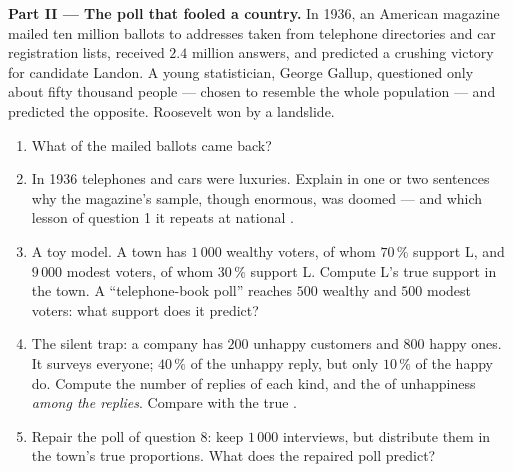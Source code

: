 \begin{problem}
\medskip
\noindent\textbf{Part II --- The poll that fooled a country.}
In 1936, an American magazine mailed ten million ballots to
addresses taken from telephone directories and car registration
lists, received $2.4$ million answers, and predicted a crushing
victory for candidate Landon. A young statistician, George
Gallup, questioned only about fifty thousand people --- chosen to
resemble the whole population --- and predicted the opposite.
Roosevelt won by a landslide.
\begin{enumerate}[resume]
  \item What  of the mailed ballots came back?
  \item In 1936 telephones and cars were luxuries. Explain in
        one or two sentences why the magazine's sample, though
        enormous, was doomed --- and which lesson of question 1
        it repeats at national .
  \item A toy model. A town has $1\,000$ wealthy voters, of whom
        $70\,\%$ support L, and $9\,000$ modest voters, of whom
        $30\,\%$ support L. Compute L's true support in the
        town. A ``telephone-book poll'' reaches $500$ wealthy
        and $500$ modest voters: what support does it predict?
  \item The silent trap: a company has $200$ unhappy customers
        and $800$ happy ones. It surveys everyone; $40\,\%$ of
        the unhappy reply, but only $10\,\%$ of the happy do.
        Compute the number of replies of each kind, and the
         of unhappiness \emph{among the replies}.
        Compare with the true .
  \item Repair the poll of question 8: keep $1\,000$
        interviews, but distribute them in the town's true
        proportions. What does the repaired poll predict?
\end{enumerate}


\end{problem}
